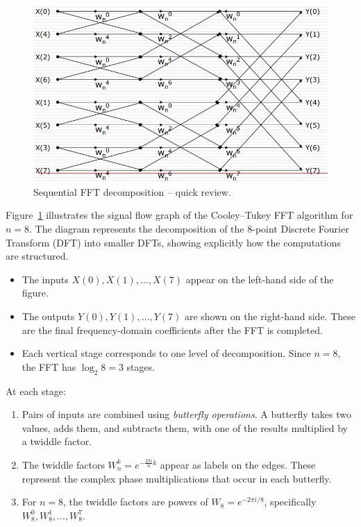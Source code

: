 \documentclass[12pt]{book}
\begin{document}
\begin{figure}[H]
    \centering
    \includegraphics[width=0.75\linewidth]{images/seqfft.png}
    \caption{Sequential FFT decomposition – quick review.}
    \label{fig:seqfftrev}
\end{figure}
Figure~\ref{fig:seqfftrev} illustrates the signal flow graph of the Cooley–Tukey FFT algorithm for $n=8$. The diagram represents the decomposition of the $8$-point Discrete Fourier Transform (DFT) into smaller DFTs, showing explicitly how the computations are structured.

\begin{itemize}
    \item The inputs $X(0), X(1), \ldots, X(7)$ appear on the left-hand side of the figure.
    \item The outputs $Y(0), Y(1), \ldots, Y(7)$ are shown on the right-hand side. These are the final frequency-domain coefficients after the FFT is completed.
    \item Each vertical stage corresponds to one level of decomposition. Since $n=8$, the FFT has $\log_2 8 = 3$ stages.
\end{itemize}

At each stage:
\begin{enumerate}
    \item Pairs of inputs are combined using \textit{butterfly operations}. A butterfly takes two values, adds them, and subtracts them, with one of the results multiplied by a twiddle factor.
    \item The twiddle factors $W_n^k = e^{-\frac{2\pi i}{n}k}$ appear as labels on the edges. These represent the complex phase multiplications that occur in each butterfly.
    \item For $n=8$, the twiddle factors are powers of $W_8 = e^{-2\pi i/8}$, specifically $W_8^0, W_8^1, \ldots, W_8^7$.
\end{enumerate}
\end{document}
